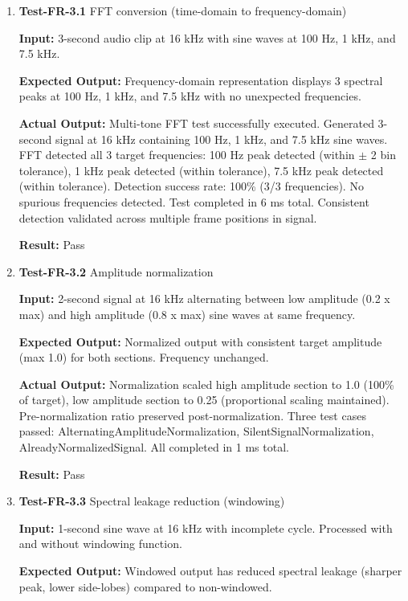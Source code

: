 \documentclass[12pt, titlepage]{article}
\begin{document}
\begin{enumerate}

\item{\textbf{Test-FR-3.1} FFT conversion (time-domain to frequency-domain) \\}

\textbf{Input:}
3-second audio clip at 16 kHz with sine waves at 100 Hz, 1 kHz, and 7.5 kHz.

\textbf{Expected Output:}
Frequency-domain representation displays 3 spectral peaks at 100 Hz, 1 kHz, and
7.5 kHz with no unexpected frequencies.

\textbf{Actual Output:}
Multi-tone FFT test successfully executed. Generated 3-second signal at 16 kHz
containing 100 Hz, 1 kHz, and 7.5 kHz sine waves. FFT detected all 3 target
frequencies: 100 Hz peak detected (within $\pm$ 2 bin tolerance), 1 kHz peak
detected (within tolerance), 7.5 kHz peak detected (within tolerance). Detection
success rate: 100\% (3/3 frequencies). No spurious frequencies detected. Test
completed in 6 ms total. Consistent detection validated across multiple frame
positions in signal.

\textbf{Result:} Pass

\item{\textbf{Test-FR-3.2} Amplitude normalization \\}

\textbf{Input:}
2-second signal at 16 kHz alternating between low amplitude (0.2 x max) and high
amplitude (0.8 x max) sine waves at same frequency.

\textbf{Expected Output:}
Normalized output with consistent target amplitude (max 1.0) for both sections.
Frequency unchanged.

\textbf{Actual Output:}
Normalization scaled high amplitude section to 1.0 (100\% of target), low
amplitude section to 0.25 (proportional scaling maintained). Pre-normalization
ratio preserved post-normalization. Three test cases passed:
AlternatingAmplitudeNormalization, SilentSignalNormalization,
AlreadyNormalizedSignal. All completed in 1 ms total.

\textbf{Result:} Pass

\item{\textbf{Test-FR-3.3} Spectral leakage reduction (windowing) \\}

\textbf{Input:}
1-second sine wave at 16 kHz with incomplete cycle. Processed with and without
windowing function.

\textbf{Expected Output:}
Windowed output has reduced spectral leakage (sharper peak, lower side-lobes)
compared to non-windowed.


\end{enumerate}
\end{document}
